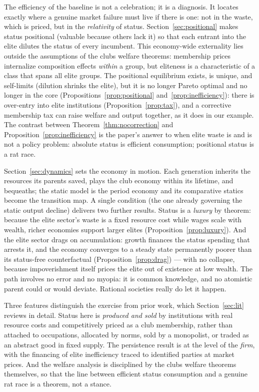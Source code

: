 \documentclass[12pt,letterpaper]{article}
\theoremstyle{definition}
\begin{document}
The efficiency of the baseline is not a celebration; it is a diagnosis.
It locates exactly where a genuine market failure must live if there is one: not in the waste, which is priced, but in the \emph{relativity} of status.
Section~\ref{sec:positional} makes status positional (valuable because others lack it) so that each entrant into the elite dilutes the status of every incumbent.
This economy-wide externality lies outside the assumptions of the clubs welfare theorems: membership prices internalize composition effects \emph{within} a group, but eliteness is a characteristic of a class that spans all elite groups.
The positional equilibrium exists, is unique, and self-limits (dilution shrinks the elite), but it is no longer Pareto optimal and no longer in the core (Propositions~\ref{prop:positional} and~\ref{prop:inefficiency}): there is over-entry into elite institutions (Proposition~\ref{prop:tax}), and a corrective membership tax can raise welfare and output together, as it does in our example.
The contrast between Theorem~\ref{thm:nocorrection} and Proposition~\ref{prop:inefficiency} is the paper's answer to when elite waste is and is not a policy problem: absolute status is efficient consumption; positional status is a rat race.

Section~\ref{sec:dynamics} sets the economy in motion.
Each generation inherits the resources its parents saved, plays the club economy within its lifetime, and bequeaths; the static model is the period economy and its comparative statics become the transition map.
A single condition (the one already governing the static output decline) delivers two further results.
Status is a \emph{luxury} by theorem: because the elite sector's waste is a fixed resource cost while wages scale with wealth, richer economies support larger elites (Proposition~\ref{prop:luxury}).
And the elite sector drags on accumulation: growth finances the status spending that arrests it, and the economy converges to a steady state permanently poorer than its status-free counterfactual (Proposition~\ref{prop:drag}) --- with no collapse, because impoverishment itself prices the elite out of existence at low wealth.
The path involves no error and no myopia: it is common knowledge, and no atomistic parent could or would deviate.
Rational societies really do let it happen.

Three features distinguish the exercise from prior work, which Section~\ref{sec:lit} reviews in detail.
Status here is \emph{produced and sold} by institutions with real resource costs and competitively priced as a club membership, rather than attached to occupations, allocated by norms, sold by a monopolist, or traded as an abstract good in fixed supply.
The persistence result is at the level of the \emph{firm}, with the financing of elite inefficiency traced to identified parties at market prices.
And the welfare analysis is disciplined by the clubs welfare theorems themselves, so that the line between efficient status consumption and a genuine rat race is a theorem, not a stance.
\end{document}
